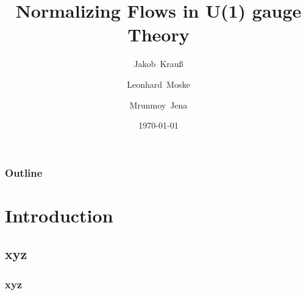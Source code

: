 \documentclass[10pt]{beamer}
\title[Normalizing Flows in U(1) Gauge Theory] %
{Normalizing Flows in U(1) gauge Theory}
\author[Krau{\ss}, Moske, Jena] %
{Jakob~Krau{\ss} \and Leonhard~Moske \and Mrunmoy~Jena}
\date{\today}
\begin{document}
\begin{frame}
    \titlepage 
\end{frame}

\begin{frame}
    \frametitle{Outline}
    \tableofcontents
\end{frame}

\section{Introduction}
\subsection{xyz}
\begin{frame}
\frametitle{xyz}
\end{frame}
\end{document}
